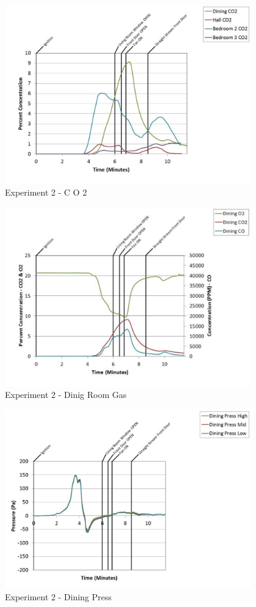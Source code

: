 \documentclass{article}
\begin{document}
\begin{appendices}
	\begin{figure}[h!]
		\centering
		\includegraphics[height=3.05in]{0_Images/Results_Charts/Exp_2_Charts/CO2.pdf}
		\caption{Experiment 2 - C O 2}
	\end{figure}
 
	\clearpage

	\begin{figure}[h!]
		\centering
		\includegraphics[height=3.05in]{0_Images/Results_Charts/Exp_2_Charts/DinigRoomGas.pdf}
		\caption{Experiment 2 - Dinig Room Gas}
	\end{figure}
 

	\begin{figure}[h!]
		\centering
		\includegraphics[height=3.05in]{0_Images/Results_Charts/Exp_2_Charts/DiningPress.pdf}
		\caption{Experiment 2 - Dining Press}
	\end{figure}
 

\end{appendices}
\end{document}
